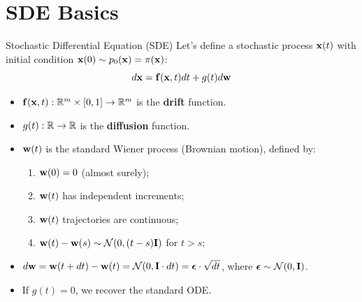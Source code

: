 \documentclass{beamer}
\begin{document}
\section{SDE Basics}
\begin{frame}{Stochastic Differential Equation (SDE)}
	Let's define a stochastic process $\mathbf{x}(t)$ with initial condition $\mathbf{x}(0) \sim p_0(\mathbf{x}) = \pi(\mathbf{x})$:
	\[
		d\mathbf{x} = \mathbf{f}(\mathbf{x}, t) dt + g(t) d \mathbf{w}
	\]
	\vspace{-0.5cm}
	\begin{itemize}
		 \item $\mathbf{f}(\mathbf{x}, t): \mathbb{R}^m \times [0, 1] \rightarrow \mathbb{R}^m$ is the \textbf{drift} function.
		 \item $g(t): \mathbb{R} \rightarrow \mathbb{R}$ is the \textbf{diffusion} function.
		 \item $\mathbf{w}(t)$ is the standard Wiener process (Brownian motion), defined by:
		 \begin{enumerate}
		 	\item $\mathbf{w}(0) = 0$ (almost surely);
		 	\item $\mathbf{w}(t)$ has independent increments;
		 	\item $\mathbf{w}(t)$ trajectories are continuous;
			\item $\mathbf{w}(t) - \mathbf{w}(s) \sim \mathcal{N}(0, (t-s) \mathbf{I})$ for $t>s$;
		 \end{enumerate}
		 \item $d\mathbf{w} = \mathbf{w}(t+dt) - \mathbf{w}(t) = \mathcal{N}(0, \mathbf{I} \cdot dt ) = \boldsymbol{\epsilon} \cdot \sqrt{dt}$, where $\boldsymbol{\epsilon} \sim \mathcal{N}(0, \mathbf{I})$.
		 \item If $g(t)=0$, we recover the standard ODE.
	\end{itemize}
\end{frame}
\end{document}
